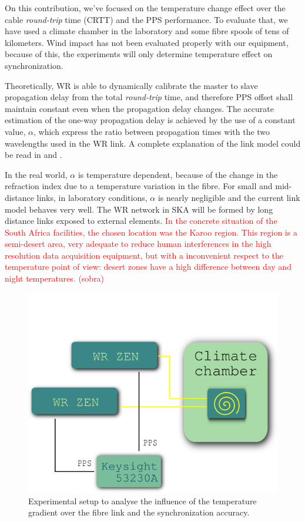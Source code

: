 
On this contribution, we've focused on the temperature change effect over the 
cable
\textit{round-trip} time (CRTT) and the PPS performance. To evaluate that, we 
have used a climate chamber in the laboratory and some fibre spools of tens of 
kilometers. 
Wind impact has not been evaluated properly with our equipment, because of this, 
the experiments will only determine temperature effect on synchronization.

Theoretically, WR is able to dynamically calibrate the master to slave 
propagation delay from the total \textit{round-trip} time, and therefore PPS 
offset shall maintain constant even when the propagation delay changes. The 
accurate estimation of the one-way propagation delay is achieved by the use of 
a constant value, $\alpha$, which express the ratio between propagation times 
with the two wavelengths used in the WR link. A complete explanation of the 
link model could be read in \cite{Wlostowski2011} and \cite{Daniluk2012}.

In the real world, $\alpha$ is temperature dependent, because of the change in 
the refraction index due to a temperature variation in the fibre. For small and 
mid-distance links, in laboratory conditions, $\alpha$ is nearly negligible and 
the current link model behaves very well. The WR network in SKA will be formed 
by long distance links exposed to external elements. \textcolor{red}{In the concrete situation 
of the South Africa facilities, the chosen location was the Karoo region. 
This region is a semi-desert area, very adequate to reduce human interferences 
in the high resolution data acquisition equipment, but with a inconvenient 
respect to the temperature point of view: desert zones have a high difference 
between day and night temperatures. (sobra)}

\begin{figure}
	\centering
	\includegraphics[width=0.7\linewidth]{img/tempsetup}
	\caption[Configuration of the climate chamber experiments]{Experimental 
		setup to analyse the influence of the temperature gradient over the 
		fibre link and the synchronization accuracy.}
	\label{fig:tempsetup}
\end{figure}


